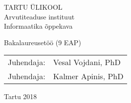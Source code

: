 \documentclass[../thesis.tex]{subfiles}
\begin{document}
\thispagestyle{empty}
\begin{center}

\large
TARTU ÜLIKOOL\\
Arvutiteaduse instituut\\
Informaatika õppekava\\%

\vspace{25mm}

\Large \myauthor

\vspace{4mm}

\huge \mytitle

\vspace{20mm}

\Large Bakalaureusetöö (9 EAP)

\end{center}

\vspace{7mm}

\begin{flushright}
 {
 \setlength{\extrarowheight}{5pt}
 \begin{tabular}{r l} 
  \sffamily Juhendaja: & \sffamily Vesal Vojdani, PhD \\
  \sffamily Juhendaja: & \sffamily Kalmer Apinis, PhD
 \end{tabular}
 }
\end{flushright}


\vfill
\centerline{Tartu 2018}
\end{document}

